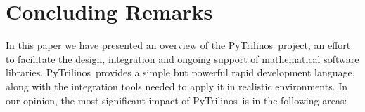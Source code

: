 \documentclass[acmtocl]{acmtrans2m}
\newcommand{\PyTrilinos}{{PyTrilinos}}
\begin{document}
%
\section{Concluding Remarks}
\label{sec:concluding}

In this paper we have presented an overview of the \PyTrilinos\ project, an
effort to facilitate the design, integration and ongoing support of
mathematical software libraries.  \PyTrilinos\ provides a simple but powerful
rapid development language, along with the integration tools needed to apply
it in realistic environments. In our opinion, the most significant impact of
\PyTrilinos\ is in the following areas:
\end{document}
